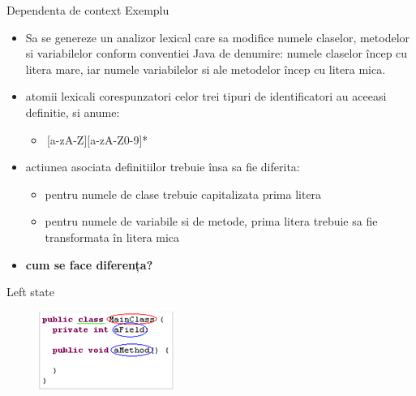 \documentclass[pdf]{beamer}
\begin{document}
\begin{frame}{Dependenta de context}
Exemplu
\begin{itemize}
\item
Sa se genereze un analizor lexical care sa modifice numele claselor, metodelor si variabilelor conform conventiei Java de denumire: numele claselor încep cu litera mare, iar numele variabilelor si ale metodelor încep cu litera mica.
\newline

\item
atomii lexicali corespunzatori celor trei tipuri de identificatori au aceeasi definitie, si anume:
\begin{itemize}
    \item 
    \,[a-zA-Z][a-zA-Z0-9]*
\end{itemize}

\item
actiunea asociata definitiilor trebuie însa sa fie diferita:

\begin{itemize}
\item
pentru numele de clase trebuie capitalizata prima litera

\item
pentru numele de variabile si de metode, prima litera trebuie sa fie transformata în litera mica
\end{itemize}

\item
\textbf{cum se face diferența?}

\end{itemize}
\end{frame}



\begin{frame}{Left state}

\begin{figure}
\centering
\includegraphics[scale=1.5]{comp.PNG}
\end{figure}


\end{frame}
\end{document}
